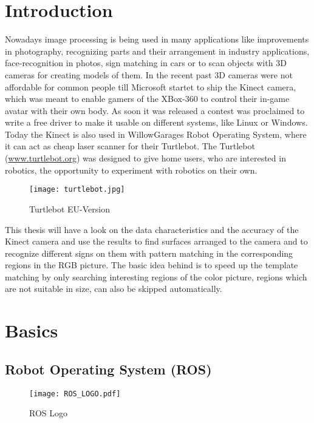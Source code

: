 \chapter{Introduction}
\graphicspath{{./Introduction/img/}}

Nowadays image processing is being used in many applications like improvements in
photography, recognizing parts and their arrangement in industry applications, 
face-recognition in photos, sign matching in cars or to scan objects with 
3D cameras for creating models of them. In the recent past 3D cameras were 
not affordable for common people till Microsoft startet to ship the Kinect 
camera, which was meant to enable gamers of the XBox-360 to control their in-game 
avatar with their own body. As soon it was released a contest was proclaimed 
to write a free driver to make it usable on different systems, like Linux or Windows.
Today the Kinect is also used in WillowGarages Robot Operating System,
where it can act as cheap laser scanner for their Turtlebot. The Turtlebot 
(\url{www.turtlebot.org}) was designed to give home users, who are interested in 
robotics, the opportunity to experiment with robotics on their own.

\begin{figure}[htp]
\begin{center}
  \texttt{[image: turtlebot.jpg]}
  \caption{Turtlebot EU-Version}
  \label{figure:turtlebot}
\end{center}
\end{figure}

This thesis will have a look on the data characteristics and the accuracy of the
Kinect camera and use the results to find surfaces arranged to the camera and to 
recognize different signs on them with pattern matching in the corresponding regions
in the RGB picture. The basic idea behind is to speed up the template matching 
by only searching interesting regions of the color picture, regions which are not
suitable in size, can also be skipped automatically.

\chapter{Basics}

\section{Robot Operating System (ROS)}
  
\begin{figure}[htp]
	\centering
	\texttt{[image: ROS\_LOGO.pdf]}
	\caption{ROS Logo}
\end{figure} 

